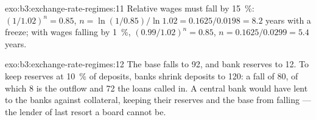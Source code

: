 \begin{solution}{exo:b3:exchange-rate-regimes:11}
Relative wages must fall by 15~\%: $(1/1.02)^n = 0.85$, $n = \ln(1/0.85)/\ln 1.02 = 0.1625/0.0198 =
8.2$ years with a freeze; with wages falling by 1~\%, $(0.99/1.02)^n = 0.85$, $n = 0.1625/0.0299
= 5.4$ years.
\end{solution}

\begin{solution}{exo:b3:exchange-rate-regimes:12}
The base falls to 92, and bank reserves to 12. To keep reserves at 10~\% of deposits,
banks shrink deposits to 120: a fall of 80, of which 8 is the outflow and 72 the
loans called in. A central bank would have lent to the banks against collateral,
keeping their reserves and the base from falling --- the lender of last resort a
board cannot be.
\end{solution}

